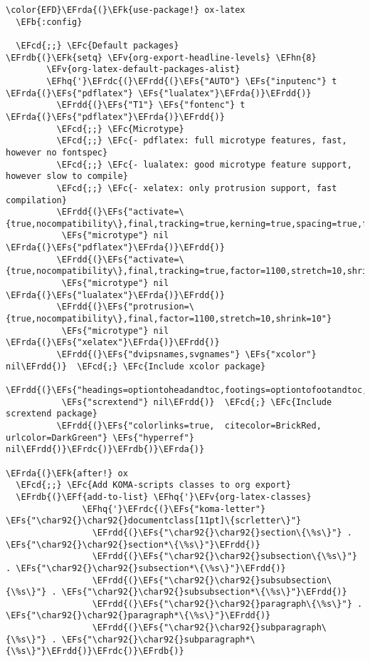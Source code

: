 \documentclass{article}
\newcommand{\EFc}[1]{\textcolor{EFc}{#1}} %
\newcommand{\EFcd}[1]{\textcolor{EFcd}{#1}} %
\newcommand{\EFs}[1]{\textcolor{EFs}{#1}} %
\newcommand{\EFk}[1]{\textcolor{EFk}{#1}} %
\newcommand{\EFb}[1]{\textcolor{EFb}{#1}} %
\newcommand{\EFf}[1]{\textcolor{EFf}{#1}} %
\newcommand{\EFv}[1]{\textcolor{EFv}{#1}} %
\newcommand{\EFhn}[1]{\textcolor{EFhn}{\textbf{#1}}} %
\newcommand{\EFhq}[1]{#1} %
\newcommand{\EFrda}[1]{\textcolor{EFrda}{#1}} %
\newcommand{\EFrdb}[1]{\textcolor{EFrdb}{#1}} %
\newcommand{\EFrdc}[1]{\textcolor{EFrdc}{#1}} %
\newcommand{\EFrdd}[1]{\textcolor{EFrdd}{#1}} %
\begin{document}
\begin{Code}
\begin{Verbatim}
\color{EFD}\EFrda{(}\EFk{use-package!} ox-latex
  \EFb{:config}

  \EFcd{;;} \EFc{Default packages}
\EFrdb{(}\EFk{setq} \EFv{org-export-headline-levels} \EFhn{8}
        \EFv{org-latex-default-packages-alist}
        \EFhq{'}\EFrdc{(}\EFrdd{(}\EFs{"AUTO"} \EFs{"inputenc"} t \EFrda{(}\EFs{"pdflatex"} \EFs{"lualatex"}\EFrda{)}\EFrdd{)}
          \EFrdd{(}\EFs{"T1"} \EFs{"fontenc"} t \EFrda{(}\EFs{"pdflatex"}\EFrda{)}\EFrdd{)}
          \EFcd{;;} \EFc{Microtype}
          \EFcd{;;} \EFc{- pdflatex: full microtype features, fast, however no fontspec}
          \EFcd{;;} \EFc{- lualatex: good microtype feature support, however slow to compile}
          \EFcd{;;} \EFc{- xelatex: only protrusion support, fast compilation}
          \EFrdd{(}\EFs{"activate=\{true,nocompatibility\},final,tracking=true,kerning=true,spacing=true,factor=1100,stretch=10,shrink=10"}
           \EFs{"microtype"} nil \EFrda{(}\EFs{"pdflatex"}\EFrda{)}\EFrdd{)}
          \EFrdd{(}\EFs{"activate=\{true,nocompatibility\},final,tracking=true,factor=1100,stretch=10,shrink=10"}
           \EFs{"microtype"} nil \EFrda{(}\EFs{"lualatex"}\EFrda{)}\EFrdd{)}
          \EFrdd{(}\EFs{"protrusion=\{true,nocompatibility\},final,factor=1100,stretch=10,shrink=10"}
           \EFs{"microtype"} nil \EFrda{(}\EFs{"xelatex"}\EFrda{)}\EFrdd{)}
          \EFrdd{(}\EFs{"dvipsnames,svgnames"} \EFs{"xcolor"} nil\EFrdd{)}  \EFcd{;} \EFc{Include xcolor package}
          \EFrdd{(}\EFs{"headings=optiontoheadandtoc,footings=optiontofootandtoc,headlines=optiontoheadandtoc"}
           \EFs{"scrextend"} nil\EFrdd{)}  \EFcd{;} \EFc{Include scrextend package}
          \EFrdd{(}\EFs{"colorlinks=true,  citecolor=BrickRed, urlcolor=DarkGreen"} \EFs{"hyperref"} nil\EFrdd{)}\EFrdc{)}\EFrdb{)}\EFrda{)}

\EFrda{(}\EFk{after!} ox
  \EFcd{;;} \EFc{Add KOMA-scripts classes to org export}
  \EFrdb{(}\EFf{add-to-list} \EFhq{'}\EFv{org-latex-classes}
               \EFhq{'}\EFrdc{(}\EFs{"koma-letter"} \EFs{"\char92{}\char92{}documentclass[11pt]\{scrletter\}"}
                 \EFrdd{(}\EFs{"\char92{}\char92{}section\{\%s\}"} . \EFs{"\char92{}\char92{}section*\{\%s\}"}\EFrdd{)}
                 \EFrdd{(}\EFs{"\char92{}\char92{}subsection\{\%s\}"} . \EFs{"\char92{}\char92{}subsection*\{\%s\}"}\EFrdd{)}
                 \EFrdd{(}\EFs{"\char92{}\char92{}subsubsection\{\%s\}"} . \EFs{"\char92{}\char92{}subsubsection*\{\%s\}"}\EFrdd{)}
                 \EFrdd{(}\EFs{"\char92{}\char92{}paragraph\{\%s\}"} . \EFs{"\char92{}\char92{}paragraph*\{\%s\}"}\EFrdd{)}
                 \EFrdd{(}\EFs{"\char92{}\char92{}subparagraph\{\%s\}"} . \EFs{"\char92{}\char92{}subparagraph*\{\%s\}"}\EFrdd{)}\EFrdc{)}\EFrdb{)}


\end{Verbatim}
\end{Code}
\end{document}
